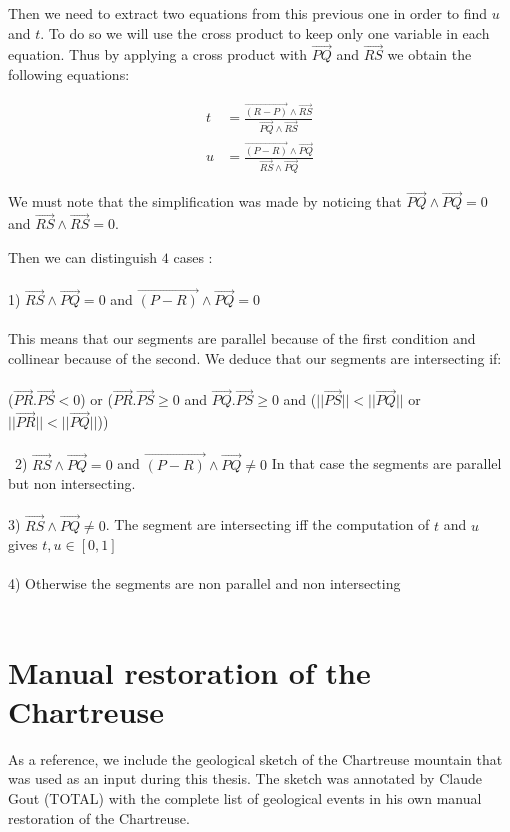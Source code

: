 \documentclass[12pt, a4paper]{report} %
\begin{document}
Then we need to extract two equations from this previous one in order to find $u$ and $t$.
To do so we will use the cross product to keep only one variable in each equation. Thus by applying a cross product with $\overrightarrow{PQ}$ and $\overrightarrow{RS}$ we obtain the following equations:

\begin{align}
	t &= \frac{\overrightarrow{(R - P)} \wedge \overrightarrow{RS}}{\overrightarrow{PQ} \wedge \overrightarrow{RS}}\\
	u &= \frac{\overrightarrow{(P - R)} \wedge \overrightarrow{PQ}}{\overrightarrow{RS} \wedge \overrightarrow{PQ}}
\end{align}

We must note that the simplification was made by noticing that $\overrightarrow{PQ} \wedge \overrightarrow{PQ} = 0$ and $\overrightarrow{RS} \wedge \overrightarrow{RS} = 0$.

Then we can distinguish $4$ cases :\\\\
1) $ \overrightarrow{RS} \wedge \overrightarrow{PQ} = 0$ and $\overrightarrow{(P - R)} \wedge \overrightarrow{PQ} = 0$\\\\
This means that our segments are parallel because of the first condition and collinear because of the second. We deduce that our segments are intersecting if: \\\\ 
($\overrightarrow{PR}.\overrightarrow{PS} < 0$) or ($\overrightarrow{PR}.\overrightarrow{PS} \geq 0$ and $\overrightarrow{PQ}.\overrightarrow{PS} \geq 0$ and ($||\overrightarrow{PS}|| < ||\overrightarrow{PQ}||$ or $||\overrightarrow{PR}|| < ||\overrightarrow{PQ}||$))
\\\\\
2)  $ \overrightarrow{RS} \wedge \overrightarrow{PQ} = 0$ and $\overrightarrow{(P - R)} \wedge \overrightarrow{PQ} \neq 0$
In that case the segments are parallel but non intersecting.\\\\
3)  $ \overrightarrow{RS} \wedge \overrightarrow{PQ} \neq 0$.
The segment are intersecting iff the computation of $t$ and $u$ gives $t,u \in [0,1]$\\\\
4) Otherwise the segments are non parallel and non intersecting\\\\

\section{Manual restoration of the Chartreuse}
As a reference, we include the geological sketch of the Chartreuse mountain that was used as an input during this thesis. The sketch was annotated by Claude Gout (TOTAL) with the complete list of geological events in his own manual restoration of the Chartreuse. 
\end{document}

